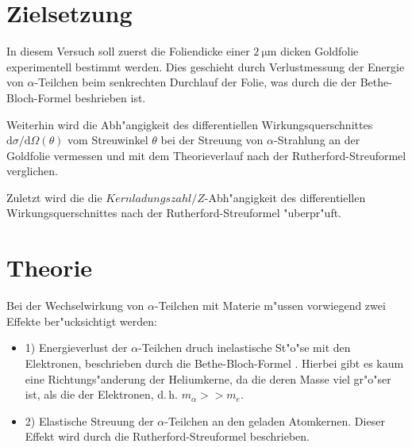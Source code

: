 \section{Zielsetzung}
  In diesem Versuch soll zuerst die Foliendicke einer $\SI{2}{\micro\meter}$ dicken Goldfolie experimentell bestimmt werden.
  Dies geschieht durch Verlustmessung der Energie von $\alpha$-Teilchen beim senkrechten Durchlauf der Folie, was durch die der Bethe-Bloch-Formel beshrieben ist.

  Weiterhin wird die Abh"angigkeit des differentiellen Wirkungsquerschnittes $\text{d}\sigma/\text{d}\Omega(\theta)$ vom Streuwinkel $\theta$ bei der Streuung von $\alpha$-Strahlung an der Goldfolie vermessen und mit dem Theorieverlauf nach der Rutherford-Streuformel verglichen.

  Zuletzt wird die die $Kernladungszahl/Z$-Abh"angigkeit des differentiellen Wirkungsquerschnittes nach der Rutherford-Streuformel "uberpr"uft.

\section{Theorie}
  \label{sec:Theorie}
  Bei der Wechselwirkung von $\alpha$-Teilchen mit Materie m"ussen vorwiegend zwei Effekte ber"ucksichtigt werden:
  \begin{itemize}
    \item 1) Energieverlust der $\alpha$-Teilchen druch inelastische St"o"se mit den Elektronen, beschrieben durch die Bethe-Bloch-Formel \cite{bethe}. Hierbei gibt es kaum eine Richtungs"anderung der Heliumkerne, da die deren Masse viel gr"o"ser ist, als die der Elektronen, d.\,h. $m_{\alpha}>>m_e$.
    \item 2) Elastische Streuung der $\alpha$-Teilchen an den geladen Atomkernen.
    Dieser Effekt wird durch die Rutherford-Streuformel beschrieben.
  \end{itemize}


